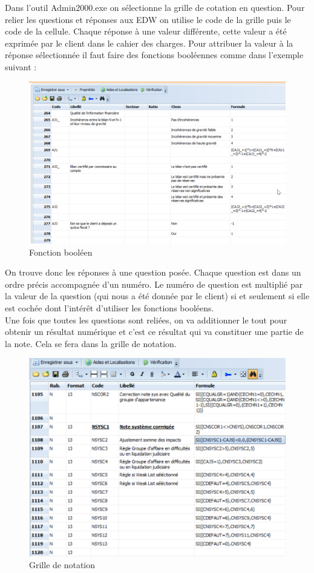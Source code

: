 Dans l'outil Admin2000.exe on sélectionne la grille de cotation en question. Pour relier les questions et réponses aux EDW on utilise le code de la grille puis le code de la cellule.
Chaque réponse à une valeur différente, cette valeur a été exprimée par le client dans le cahier des charges. Pour attribuer la valeur à la réponse sélectionnée il faut faire des fonctions booléennes comme dans l'exemple suivant : 


\begin{figure}[ht]
\centering
\includegraphics[scale=0.5]{resources/fctBoolAdmin.png}
\caption{Fonction booléen}
\label{fctBool}
\end{figure}


On trouve donc les réponses à une question posée. Chaque question est dans un ordre précis accompagnée d'un numéro. Le numéro de question est multiplié par la valeur de la question (qui nous a été donnée par le client) si et seulement si elle est cochée dont l'intérêt d'utiliser les fonctions booléens.\\

Une fois que toutes les questions sont reliées, on va additionner le tout pour obtenir un résultat numérique et c'est ce résultat qui va constituer une partie de la note. Cela se fera dans la grille de notation.

\begin{figure}[ht]
\centering
\includegraphics[scale=0.6]{resources/grille_notation.png}
\caption{Grille de notation}
\label{grCot}
\end{figure}

